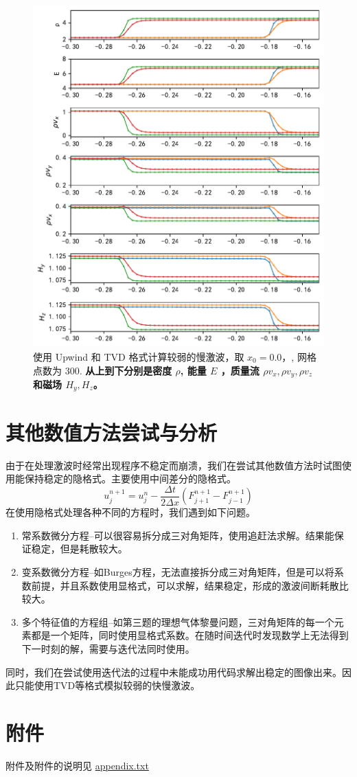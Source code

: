 \documentclass[10.5pt
]{article}
\begin{document}
\begin{figure}[htpb]
	\centering
	\includegraphics[width=\textwidth]{figures/case1_slow_upwind_TVD.pdf}
	\caption{使用 Upwind 和 TVD 格式计算较弱的慢激波，取 \(x_0 = 0.0，\), 网格点数为 300. \textbf{从上到下分别是密度 $\rho$, 能量 $E$ ，质量流 $\rho v_x, \rho v_y, \rho v_z$ 和磁场 $H_y, H_z$。}
	}%
	\label{fig:upwind_tvd_3}
\end{figure}

\section{其他数值方法尝试与分析}
由于在处理激波时经常出现程序不稳定而崩溃，我们在尝试其他数值方法时试图使用能保持稳定的隐格式。主要使用中间差分的隐格式。
$$
u_j^{n+1} = u_j^n - \frac{\Delta t}{2\Delta x} (F_{j+1}^{n+1} - F_{j-1}^{n+1})
$$
在使用隐格式处理各种不同的方程时，我们遇到如下问题。
\begin{enumerate}
\item
常系数微分方程--可以很容易拆分成三对角矩阵，使用追赶法求解。结果能保证稳定，但是耗散较大。
\item
变系数微分方程--如Burges方程，无法直接拆分成三对角矩阵，但是可以将系数前提，并且系数使用显格式，可以求解，结果稳定，形成的激波间断耗散比较大。
\item
多个特征值的方程组--如第三题的理想气体黎曼问题，三对角矩阵的每一个元素都是一个矩阵，同时使用显格式系数。在随时间迭代时发现数学上无法得到下一时刻的解，需要与迭代法同时使用。
\end{enumerate}
同时，我们在尝试使用迭代法的过程中未能成功用代码求解出稳定的图像出来。因此只能使用TVD等格式模拟较弱的快慢激波。
\section{附件}
附件及附件的说明见 \href{./appendix.txt}{appendix.txt} 


% 
%


\end{document}
